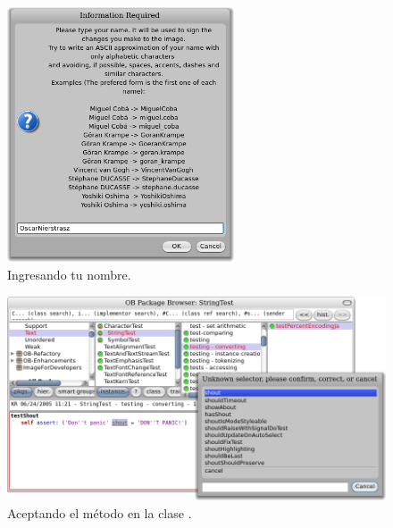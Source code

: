 \documentclass[a4paper,10pt,twoside]{book}
\begin{document}
\begin{figure}[htb]
\centerline {\includegraphics[width=0.6\textwidth]{name}}
\caption{Ingresando tu nombre.}
\end{figure}

\begin{figure}[htb]
\centerline {\includegraphics[width=\textwidth]{testShoutConfirm}}
\caption{Aceptando el m\'etodo  en la clase .}
\end{figure}



\end{document}
